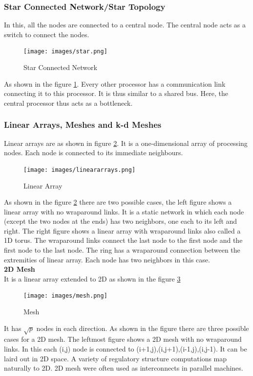 \documentclass[12pt]{article}
\begin{document}
\subsubsection{Star Connected Network/Star Topology}
In this, all the nodes are connected to a central node. The central node acts as a switch to connect the nodes.
\begin{figure}[H]
    \centering
    \texttt{[image: images/star.png]}
    \caption{Star Connected Network}
    \label{fig:star}
\end{figure}
As shown in the figure \ref{fig:star}. Every other processor has a communication link connecting it to this processor. It is thus similar to 
a shared bus. Here, the central processor thus acts as a bottleneck.

\subsubsection{Linear Arrays, Meshes and k-d Meshes}
Linear arrays are as shown in figure \ref{fig:linear}. It is a one-dimensional array of processing nodes. Each node is connected to its immediate neighbours.
\begin{figure}[H]
    \centering
    \texttt{[image: images/lineararrays.png]}
    \caption{Linear Array}
    \label{fig:linear}
\end{figure}
As shown in the figure \ref{fig:linear} there are two possible cases, the left figure shows a linear array with no wraparound links. It is a 
static network in which each node (except the two nodes at the ends) has two neighbors, one each to its left and right.
The right figure shows a linear array with wraparound links also called a 1D torus. The wraparound links connect the last node to the first node and the first node to the last node.
The ring has a wraparound connection between the extremities of linear array. Each node has two neighbors in this case.\\
\textbf{2D Mesh}\\
It is a linear array extended to 2D as shown in the figure \ref{fig:2dmesh}
\begin{figure}[H]
    \centering
    \texttt{[image: images/mesh.png]}
    \caption{Mesh}
    \label{fig:2dmesh}
\end{figure}
It has $\sqrt{p}$ nodes in each direction. As shown in the figure there are three possible cases for a 2D mesh.
The leftmost figure shows a 2D mesh with no wraparound links. In this each (i,j) node is connected to (i+1,j),(i,j+1),(i-1,j),(i,j-1).
It can be laird out in 2D space. A variety of regulatory structure computations map naturally to 2D. 2D mesh were often used as interconnects in parallel machines.\\
\end{document}
